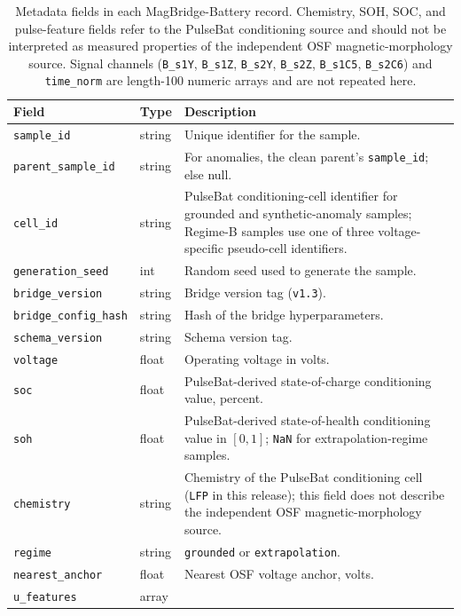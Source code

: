 \documentclass[11pt]{article}
\begin{document}
\begin{table}[!htb]
\centering
\caption{Metadata fields in each MagBridge-Battery record. Chemistry,
SOH, SOC, and pulse-feature fields refer to the PulseBat conditioning
source and should not be interpreted as measured properties of the
independent OSF magnetic-morphology source. Signal channels
(\texttt{B\_s1Y}, \texttt{B\_s1Z}, \texttt{B\_s2Y},
\texttt{B\_s2Z}, \texttt{B\_s1C5}, \texttt{B\_s2C6}) and
\texttt{time\_norm} are length-100 numeric arrays and are not repeated here.}
\label{tab:fields}
\small
\begin{tabularx}{\textwidth}{@{}llX@{}}
\toprule
Field & Type & Description \\
\midrule
\texttt{sample\_id}          & string  & Unique identifier for the sample. \\
\texttt{parent\_sample\_id}  & string  & For anomalies, the clean parent's \texttt{sample\_id}; else null. \\
\texttt{cell\_id} & string &
PulseBat conditioning-cell identifier for grounded and synthetic-anomaly
samples; Regime-B samples use one of three voltage-specific pseudo-cell
identifiers. \\
\texttt{generation\_seed}    & int     & Random seed used to generate the sample. \\
\texttt{bridge\_version}     & string  & Bridge version tag (\texttt{v1.3}). \\
\texttt{bridge\_config\_hash}& string  & Hash of the bridge hyperparameters. \\
\texttt{schema\_version}     & string  & Schema version tag. \\
\texttt{voltage}             & float   & Operating voltage in volts. \\
\texttt{soc} & float &
PulseBat-derived state-of-charge conditioning value, percent. \\
\texttt{soh} & float &
PulseBat-derived state-of-health conditioning value in $[0,1]$;
\texttt{NaN} for extrapolation-regime samples. \\
\texttt{chemistry} & string &
Chemistry of the PulseBat conditioning cell (\texttt{LFP} in this release);
this field does not describe the independent OSF magnetic-morphology source. \\
\texttt{regime}              & string  & \texttt{grounded} or \texttt{extrapolation}. \\
\texttt{nearest\_anchor}     & float   & Nearest OSF voltage anchor, volts. \\
\texttt{u\_features} & array &

\end{tabularx}
\end{table}
\end{document}
